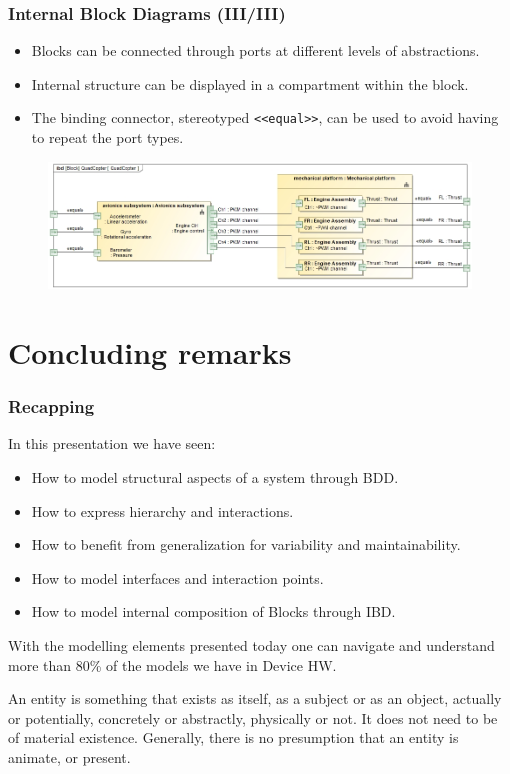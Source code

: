 \documentclass[xcolor=dvipsnames,t]{beamer}
\begin{document}
\begin{frame}
\frametitle{Internal Block Diagrams (III/III)}

\begin{itemize}
\item Blocks can be connected through ports at different levels of abstractions.
\item Internal structure can be displayed in a compartment within the block.
\item The binding connector, stereotyped \texttt{<<equal>>}, can be used to avoid having to repeat the port types.
\end{itemize}

\begin{figure}
    \includegraphics[width=\textwidth]{Composite.jpg}
\end{figure}
\end{frame}

\section{Concluding remarks}

\begin{frame}
\frametitle {Recapping}

In this presentation we have seen:
\begin{itemize}
\item How to model structural aspects of a system through BDD.
\item How to express hierarchy and interactions.
\item How to benefit from generalization for variability and maintainability.
\item How to model interfaces and interaction points.
\item How to model internal composition of Blocks through IBD.
\end{itemize}

With the modelling elements presented today one can navigate and understand more than 80\% of the models we have in Device HW.

\vspace{2mm}
\begin{block}{}
An entity is something that exists as itself, as a subject or as an object, actually or potentially, concretely or abstractly, physically or not. It does not need to be of material existence. Generally, there is no presumption that an entity is animate, or present.
\end{block}

\end{frame}
\end{document}
